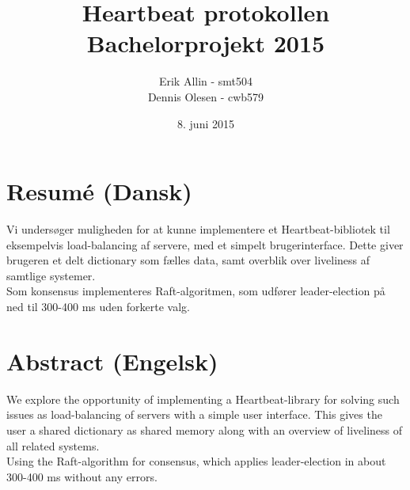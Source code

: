 \documentclass[a4paper,12pt]{article}
\title{Heartbeat protokollen \\ Bachelorprojekt 2015}
\author{Erik Allin - smt504 \\ Dennis Olesen - cwb579}
\date{8. juni 2015}
\begin{document}
\maketitle
\newpage
\renewcommand*\contentsname{Indholdsfortegnelse}
\tableofcontents
\newpage
\clearpage

\section{Resumé (Dansk)}
Vi undersøger muligheden for at kunne implementere et Heartbeat-bibliotek til eksempelvis load-balancing af servere, med et simpelt brugerinterface. Dette giver brugeren et delt dictionary som fælles data, samt overblik over liveliness af samtlige systemer.
\\
Som konsensus implementeres Raft-algoritmen, som udfører leader-election på ned til 300-400 ms uden forkerte valg. 

\section{Abstract (Engelsk)}
We explore the opportunity of implementing a Heartbeat-library for solving such issues as load-balancing of servers with a simple user interface. This gives the user a shared dictionary as shared memory along with an overview of liveliness of all related systems.
\\
Using the Raft-algorithm for consensus, which applies leader-election in about 300-400 ms without any errors.

\newpage
\end{document}
